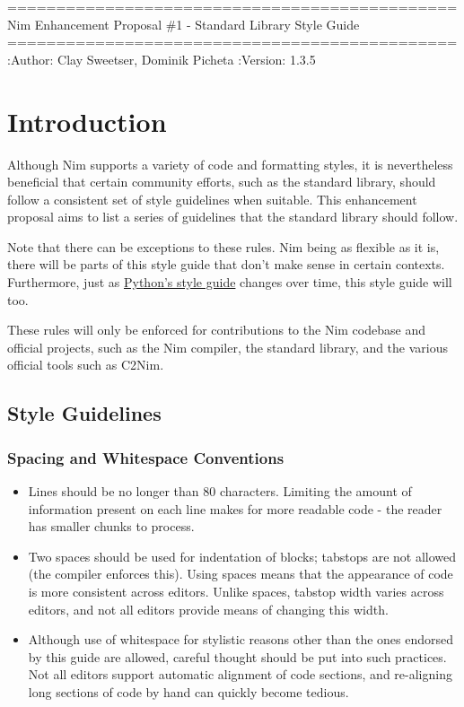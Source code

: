============================================== Nim Enhancement Proposal
\#1 - Standard Library Style Guide
============================================== :Author: Clay Sweetser,
Dominik Picheta :Version: 1.3.5

\hypertarget{introduction}{%
\section{Introduction}\label{introduction}}

Although Nim supports a variety of code and formatting styles, it is
nevertheless beneficial that certain community efforts, such as the
standard library, should follow a consistent set of style guidelines
when suitable. This enhancement proposal aims to list a series of
guidelines that the standard library should follow.

Note that there can be exceptions to these rules. Nim being as flexible
as it is, there will be parts of this style guide that don't make sense
in certain contexts. Furthermore, just as
\href{http://legacy.python.org/dev/peps/pep-0008/}{Python's style guide}
changes over time, this style guide will too.

These rules will only be enforced for contributions to the Nim codebase
and official projects, such as the Nim compiler, the standard library,
and the various official tools such as C2Nim.

\hypertarget{style-guidelines}{%
\subsection{Style Guidelines}\label{style-guidelines}}

\hypertarget{spacing-and-whitespace-conventions}{%
\subsubsection{Spacing and Whitespace
Conventions}\label{spacing-and-whitespace-conventions}}

\begin{itemize}
\item
  Lines should be no longer than 80 characters. Limiting the amount of
  information present on each line makes for more readable code - the
  reader has smaller chunks to process.
\item
  Two spaces should be used for indentation of blocks; tabstops are not
  allowed (the compiler enforces this). Using spaces means that the
  appearance of code is more consistent across editors. Unlike spaces,
  tabstop width varies across editors, and not all editors provide means
  of changing this width.
\item
  Although use of whitespace for stylistic reasons other than the ones
  endorsed by this guide are allowed, careful thought should be put into
  such practices. Not all editors support automatic alignment of code
  sections, and re-aligning long sections of code by hand can quickly
  become tedious.

\begin{verbatim}
\end{verbatim}
\end{itemize}

